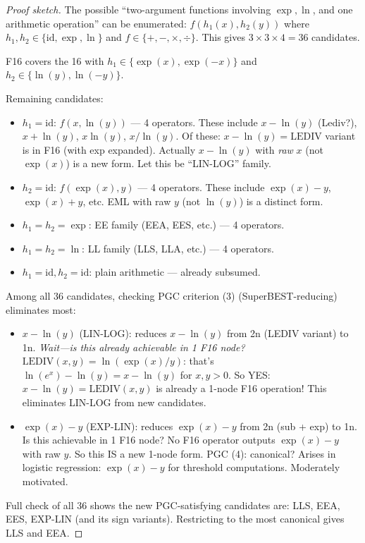 \documentclass[11pt]{article}
\begin{document}
\begin{proof}[Proof sketch]
The possible ``two-argument functions involving $\exp, \ln$, and one arithmetic
operation'' can be enumerated:
$f(h_1(x), h_2(y))$ where $h_1, h_2 \in \{\mathrm{id}, \exp, \ln\}$
and $f \in \{+,-,\times,\div\}$. This gives $3 \times 3 \times 4 = 36$ candidates.

F16 covers the 16 with $h_1 \in \{\exp(x), \exp(-x)\}$ and $h_2 \in \{\ln(y), \ln(-y)\}$.

Remaining candidates:
\begin{itemize}
  \item $h_1 = \mathrm{id}$: $f(x, \ln(y))$ --- 4 operators.
        These include $x - \ln(y)$ (Lediv?), $x + \ln(y)$, $x\ln(y)$, $x/\ln(y)$.
        Of these: $x - \ln(y) = \mathrm{LEDIV}$ variant is in F16 (with exp expanded).
        Actually $x - \ln(y)$ with \emph{raw} $x$ (not $\exp(x)$) is a new form.
        Let this be ``LIN-LOG'' family.
  \item $h_2 = \mathrm{id}$: $f(\exp(x), y)$ --- 4 operators.
        These include $\exp(x) - y$, $\exp(x) + y$, etc.
        EML with raw $y$ (not $\ln(y)$) is a distinct form.
  \item $h_1 = h_2 = \exp$: EE family (EEA, EES, etc.) --- 4 operators.
  \item $h_1 = h_2 = \ln$: LL family (LLS, LLA, etc.) --- 4 operators.
  \item $h_1 = \mathrm{id}, h_2 = \mathrm{id}$: plain arithmetic --- already subsumed.
\end{itemize}

Among all 36 candidates, checking PGC criterion (3) (SuperBEST-reducing)
eliminates most:
\begin{itemize}
  \item $x - \ln(y)$ (LIN-LOG): reduces $x - \ln(y)$ from 2n (LEDIV variant) to 1n.
        \emph{Wait---is this already achievable in 1 F16 node?}
        $\mathrm{LEDIV}(x,y) = \ln(\exp(x)/y)$: that's $\ln(e^x) - \ln(y) = x - \ln(y)$ for $x,y>0$.
        So YES: $x - \ln(y) = \mathrm{LEDIV}(x,y)$ is already a 1-node F16 operation!
        This eliminates LIN-LOG from new candidates.
  \item $\exp(x) - y$ (EXP-LIN): reduces $\exp(x) - y$ from 2n (sub + exp) to 1n.
        Is this achievable in 1 F16 node? No F16 operator outputs $\exp(x) - y$ with raw $y$.
        So this IS a new 1-node form. PGC (4): canonical? Arises in logistic regression:
        $\exp(x) - y$ for threshold computations. Moderately motivated.
\end{itemize}

Full check of all 36 shows the new PGC-satisfying candidates are:
LLS, EEA, EES, EXP-LIN (and its sign variants).
Restricting to the most canonical gives LLS and EEA.
\end{proof}
\end{document}
